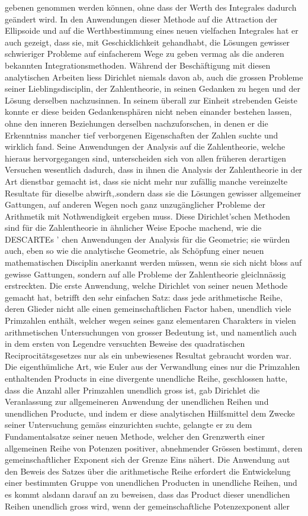\documentclass[11pt]{article}
\begin{document}
\noindent gebenen genommen werden können, ohne dass der Werth des Integrales dadurch geändert wird. In den Anwendungen dieser Methode auf die Attraction der Ellipsoide und auf die Werthbestimmung eines neuen vielfachen Integrales hat er auch gezeigt, dass sie, mit Geschicklichkeit gehandhabt, die Lösungen gewisser schwieriger Probleme auf einfacherem Wege zu geben vermag als die anderen bekannten Integrationsmethoden. Während der Beschäftigung mit diesen analytischen Arbeiten liess Dirichlet niemals davon ab, auch die grossen Probleme seiner Lieblingsdisciplin, der Zahlentheorie, in seinen Gedanken zu hegen und der Lösung derselben nachzusinnen. In seinem überall zur Einheit strebenden Geiste konnte er diese beiden Gedankensphären nicht neben einander bestehen lassen, ohne den inneren Beziehungen derselben nachzuforschen, in denen er die Erkenntniss mancher tief verborgenen Eigenschaften der Zahlen suchte und wirklich fand. Seine Anwendungen der Analysis auf die Zahlentheorie, welche hieraus hervorgegangen sind, unterscheiden sich von allen früheren derartigen Versuchen wesentlich dadurch, dass in ihnen die Analysis der Zahlentheorie in der Art dienstbar gemacht ist, dass sie nicht mehr nur zufällig manche vereinzelte Resultate für dieselbe abwirft,.sondern dass sie die Lösungen gewisser allgemeiner Gattungen, auf anderen Wegen noch ganz unzugänglicher Probleme der Arithmetik mit Nothwendigkeit ergeben muss. Diese Dirichlet’schen Methoden sind für die Zahlentheorie in ähnlicher Weise Epoche machend, wie die DESCARTEs ' chen Anwendungen der Analysis für die Geometrie; sie würden auch, eben so wie die analytische Geometrie, als Schöpfung einer neuen mathematischen Disciplin anerkannt werden müssen, wenn sie sich nicht bloss auf gewisse Gattungen, sondern auf alle Probleme der Zahlentheorie gleiclnnässig erstreckten. Die erste Anwendung, welche Dirichlet von seiner neuen Methode gemacht hat, betrifft den sehr einfachen Satz: dass jede arithmetische Reihe, deren Glieder nicht alle einen gemeinschaftlichen Factor haben, unendlich viele Primzahlen enthält, welcher wegen seines ganz elementaren Charakters in vielen arithmetischen Untersuchungen von grosser Bedeutung ist, und namentlich auch in dem ersten von Legendre versuchten Beweise des quadratischen Reciprocitätsgesetzes nur als ein unbewiesenes Resultat gebraucht worden war. Die eigenthümliche Art, wie Euler aus der Verwandlung eines nur die Primzahlen enthaltenden Products in eine divergente unendliche Reihe, geschlossen hatte, dass die Anzahl aller Primzahlen unendlich gross ist, gab Dirichlet die Veranlassung zur allgemeineren Anwendung der unendlichen Reihen und unendlichen Producte, und indem er diese analytischen Hiilfsmittel dem Zwecke seiner Untersuchung gemäss einzurichten suchte, gelangte er zu dem Fundamentalsatze seiner neuen Methode, welcher den Grenzwerth einer allgemeinen Reihe von Potenzen positiver, abnehmender Grössen bestimmt, deren gemeinschaftlicher Exponent sich der Grenze Eins nähert. Die Anwendung aut den Beweis des Satzes über die arithmetische Reihe erfordert die Entwickelung einer bestimmten Gruppe von unendlichen Producten in unendliche Reihen, und es kommt alsdann darauf an zu beweisen, dass das Product dieser unendlichen Reihen unendlich gross wird, wenn der gemeinschaftliche Potenzexponent aller 
\end{document}
